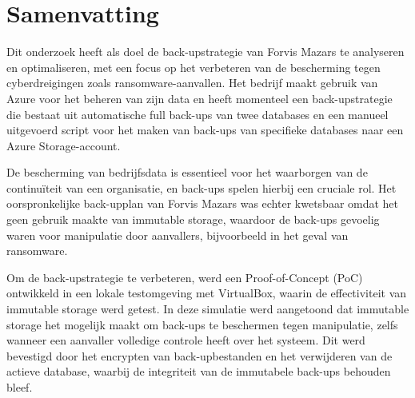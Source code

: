 
%
%
%
%
%

%



\chapter*{Samenvatting}
Dit onderzoek heeft als doel de back-upstrategie van Forvis Mazars te analyseren en optimaliseren, met een focus op het verbeteren van de bescherming tegen cyberdreigingen zoals ransomware-aanvallen. Het bedrijf maakt gebruik van Azure voor het beheren van zijn data en heeft momenteel een back-upstrategie die bestaat uit automatische full back-ups van twee databases en een manueel uitgevoerd script voor het maken van back-ups van specifieke databases naar een Azure Storage-account.

De bescherming van bedrijfsdata is essentieel voor het waarborgen van de continuïteit van een organisatie, en back-ups spelen hierbij een cruciale rol. Het oorspronkelijke back-upplan van Forvis Mazars was echter kwetsbaar omdat het geen gebruik maakte van immutable storage, waardoor de back-ups gevoelig waren voor manipulatie door aanvallers, bijvoorbeeld in het geval van ransomware.

Om de back-upstrategie te verbeteren, werd een Proof-of-Concept (PoC) ontwikkeld in een lokale testomgeving met VirtualBox, waarin de effectiviteit van immutable storage werd getest. In deze simulatie werd aangetoond dat immutable storage het mogelijk maakt om back-ups te beschermen tegen manipulatie, zelfs wanneer een aanvaller volledige controle heeft over het systeem. Dit werd bevestigd door het encrypten van back-upbestanden en het verwijderen van de actieve database, waarbij de integriteit van de immutabele back-ups behouden bleef.

